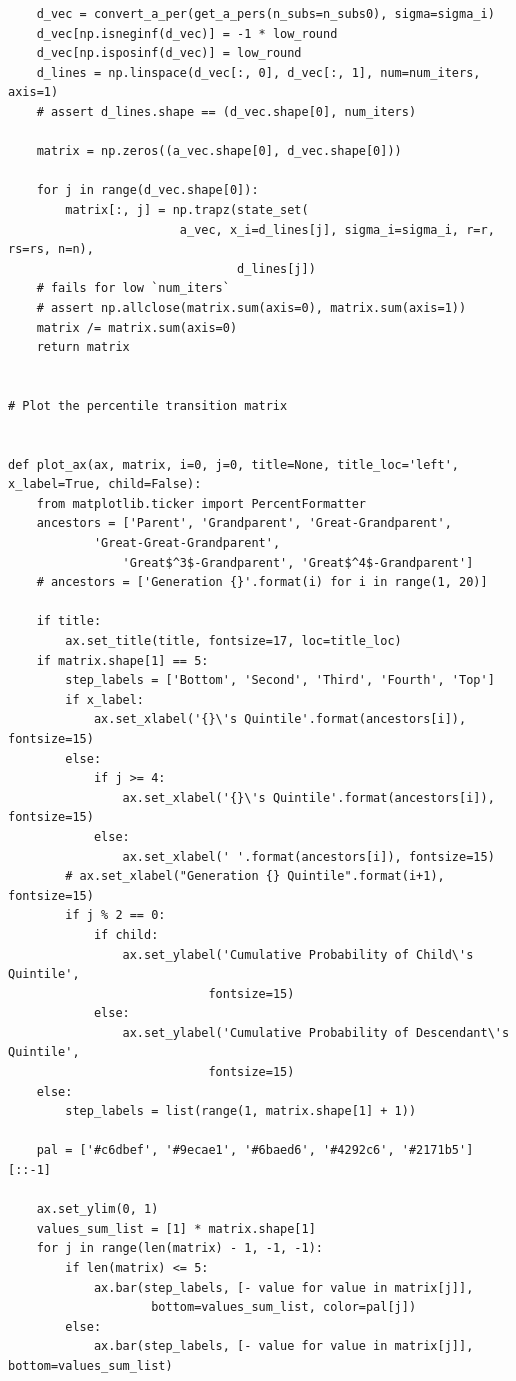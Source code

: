 \documentclass[a4paper,11pt]{article} %
\begin{document}
\begin{verbatim}
    d_vec = convert_a_per(get_a_pers(n_subs=n_subs0), sigma=sigma_i)
    d_vec[np.isneginf(d_vec)] = -1 * low_round
    d_vec[np.isposinf(d_vec)] = low_round
    d_lines = np.linspace(d_vec[:, 0], d_vec[:, 1], num=num_iters, axis=1)
    # assert d_lines.shape == (d_vec.shape[0], num_iters)

    matrix = np.zeros((a_vec.shape[0], d_vec.shape[0]))

    for j in range(d_vec.shape[0]):
        matrix[:, j] = np.trapz(state_set(
                        a_vec, x_i=d_lines[j], sigma_i=sigma_i, r=r, rs=rs, n=n),
                                d_lines[j])
    # fails for low `num_iters`
    # assert np.allclose(matrix.sum(axis=0), matrix.sum(axis=1))  
    matrix /= matrix.sum(axis=0)
    return matrix


# Plot the percentile transition matrix


def plot_ax(ax, matrix, i=0, j=0, title=None, title_loc='left', 
x_label=True, child=False):
    from matplotlib.ticker import PercentFormatter
    ancestors = ['Parent', 'Grandparent', 'Great-Grandparent', 
    		'Great-Great-Grandparent',
                'Great$^3$-Grandparent', 'Great$^4$-Grandparent']
    # ancestors = ['Generation {}'.format(i) for i in range(1, 20)]

    if title:
        ax.set_title(title, fontsize=17, loc=title_loc)
    if matrix.shape[1] == 5:
        step_labels = ['Bottom', 'Second', 'Third', 'Fourth', 'Top']
        if x_label:
            ax.set_xlabel('{}\'s Quintile'.format(ancestors[i]), fontsize=15)
        else:
            if j >= 4:
                ax.set_xlabel('{}\'s Quintile'.format(ancestors[i]), fontsize=15)
            else:
                ax.set_xlabel(' '.format(ancestors[i]), fontsize=15)
        # ax.set_xlabel("Generation {} Quintile".format(i+1), fontsize=15)
        if j % 2 == 0:
            if child:
                ax.set_ylabel('Cumulative Probability of Child\'s Quintile', 
                			fontsize=15)
            else:
                ax.set_ylabel('Cumulative Probability of Descendant\'s Quintile', 
                			fontsize=15)
    else:
        step_labels = list(range(1, matrix.shape[1] + 1))

    pal = ['#c6dbef', '#9ecae1', '#6baed6', '#4292c6', '#2171b5'][::-1]

    ax.set_ylim(0, 1)
    values_sum_list = [1] * matrix.shape[1]
    for j in range(len(matrix) - 1, -1, -1):
        if len(matrix) <= 5:
            ax.bar(step_labels, [- value for value in matrix[j]], 
            		bottom=values_sum_list, color=pal[j])
        else:
            ax.bar(step_labels, [- value for value in matrix[j]], bottom=values_sum_list)


\end{verbatim}
\end{document}

